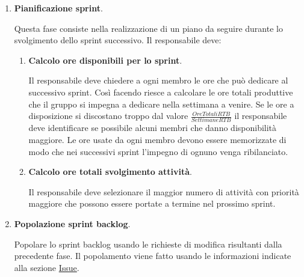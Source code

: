 \begin{enumerate}
    \item \textbf{Pianificazione sprint}.
    
    Questa fase consiste nella realizzazione di un piano da seguire durante lo svolgimento dello sprint successivo.
    Il responsabile deve:
    \begin{enumerate}
        \item \textbf{Calcolo ore disponibili per lo sprint}.
        
        Il responsabile deve chiedere a ogni  membro le ore che può dedicare al successivo sprint.
        Così facendo riesce a calcolare le ore totali produttive che il gruppo si impegna a dedicare nella settimana a venire.
        Se le ore a disposizione si discostano troppo dal valore $\frac{Ore Totali RTB}{Settimane RTB}$ il responsabile deve identificare se possibile alcuni membri che danno disponibilità maggiore.
        Le ore usate da ogni membro devono essere memorizzate di modo che nei successivi sprint l'impegno di ognuno venga ribilanciato.

        \item \textbf{Calcolo ore totali svolgimento attività}.
        
        Il responsabile deve selezionare il maggior numero di attività con priorità maggiore che possono essere portate a termine nel prossimo sprint.
    \end{enumerate}

    \item \textbf{Popolazione sprint backlog}.
    
    Popolare lo sprint backlog usando le richieste di modifica risultanti dalla precedente fase.
    Il popolamento viene fatto usando le informazioni indicate alla sezione \hyperref[subpar:ITS]{Issue}.
\end{enumerate}

